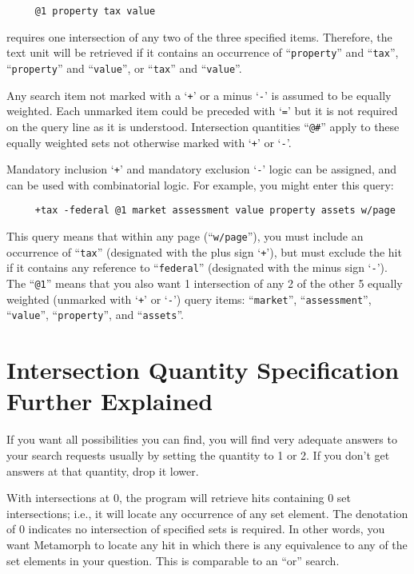 \begin{verbatim}
     @1 property tax value
\end{verbatim}

requires one intersection of any two of the three specified items.
Therefore, the text unit will be retrieved if it contains an
occurrence of ``\verb`property`'' and ``\verb`tax`'',
``\verb`property`'' and ``\verb`value`'', or ``\verb`tax`'' and
``\verb`value`''.

Any search item not marked with a `\verb`+`' or a minus `\verb`-`' is
assumed to be equally weighted.  Each unmarked item could be preceded
with `\verb`=`' but it is not required on the query line as it is
understood.  Intersection quantities ``\verb`@#`'' apply to these
equally weighted sets not otherwise marked with `\verb`+`' or
`\verb`-`'.

Mandatory inclusion `\verb`+`' and mandatory exclusion `\verb`-`'
logic can be assigned, and can be used with combinatorial logic.  For
example, you might enter this query:

\begin{verbatim}
     +tax -federal @1 market assessment value property assets w/page
\end{verbatim}

This query means that within any page (``\verb`w/page`''), you must
include an occurrence of ``\verb`tax`'' (designated with the plus sign
`\verb`+`'), but must exclude the hit if it contains any reference to
``\verb`federal`'' (designated with the minus sign `\verb`-`').  The
``\verb`@1`'' means that you also want 1 intersection of any 2 of the
other 5 equally weighted (unmarked with `\verb`+`' or `\verb`-`')
query items:  ``\verb`market`'', ``\verb`assessment`'',
``\verb`value`'', ``\verb`property`'', and ``\verb`assets`''.

\section{Intersection Quantity Specification Further Explained}

If you want all possibilities you can find, you will find very
adequate answers to your search requests usually by setting the
quantity to 1 or 2. If you don't get answers at that quantity, drop it
lower.

With intersections at 0, the program will retrieve hits containing 0
set intersections; i.e., it will locate any occurrence of any set
element.  The denotation of 0 indicates no intersection of specified
sets is required.  In other words, you want Metamorph to locate any
hit in which there is any equivalence to any of the set elements in
your question.  This is comparable to an ``or'' search.

